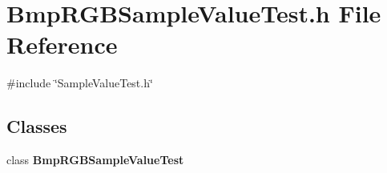 \section{Bmp\+R\+G\+B\+Sample\+Value\+Test.\+h File Reference}
\label{BmpRGBSampleValueTest_8h}
{\ttfamily \#include \char`\"{}Sample\+Value\+Test.\+h\char`\"{}}\newline
\subsection*{Classes}
\begin{DoxyCompactItemize}
\item 
class \textbf{ Bmp\+R\+G\+B\+Sample\+Value\+Test}
\end{DoxyCompactItemize}
